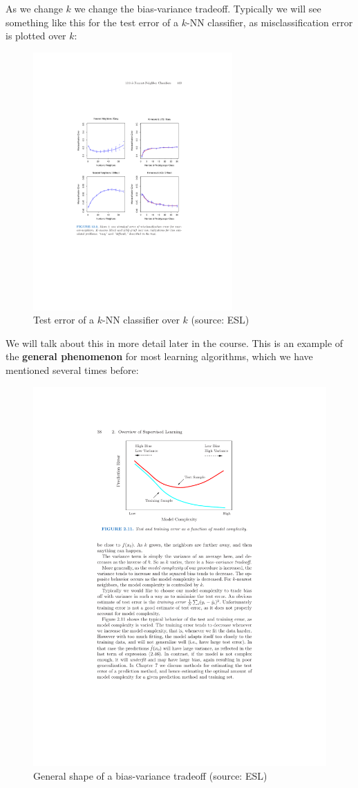 As we change $k$ we change the bias-variance tradeoff. Typically we will see
something like this for the test error of a $k$-NN classifier, as
misclassification error is plotted over $k$:

 \begin{figure}[h!]
  \centering
  \includegraphics[width=3in]{esl_nn_vary.pdf}
  \caption{Test error of a $k$-NN classifier over $k$ (source: ESL)}
\end{figure}


We will talk about this in more detail later in the course. This is an example
of the {\bf general phenomenon} for most learning algorithms, which we have mentioned several times before: 

 \begin{figure}[h!]
  \centering
  \includegraphics[width=4.5in]{ESL_bias_variance.pdf}
  \caption{General shape of a bias-variance tradeoff (source: ESL)}
\end{figure}


